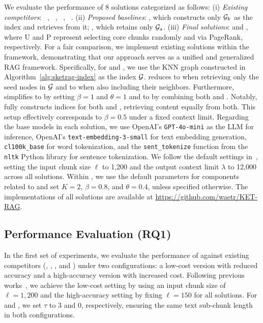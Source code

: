 We evaluate the performance of 8 solutions categorized as follows: (i) \textit{Existing competitors}: \textrag~\cite{lewis2020retrieval}, \knnrag~\cite{wang2024knowledge}, \kgrag~\cite{edge2024local}, \hybridrag~\cite{sarmah2024hybridrag}. (ii) \textit{Proposed baselines}: \keyrag, which constructs only $\mathcal{G}_k$ as the index and retrieves from it; \skeletonrag, which retains only $\mathcal{G}_s$. (iii) \textit{Final solutions}: \sketragu and \sketragp, where \textsf{U} and \textsf{P} represent selecting core chunks randomly and via PageRank, respectively. For a fair comparison, we implement existing solutions within the \sketrag framework, demonstrating that our approach serves as a unified and generalized RAG framework. Specifically, for \textrag and \knnrag, we use the KNN graph constructed in Algorithm~\ref{alg:sketrag-index} as the index $\mathcal{G}$. \sketrag reduces to \textrag when retrieving only the seed nodes in $\mathcal{G}$ and to \knnrag when also including their neighbors. Furthermore, \sketrag simplifies to \kgrag by setting $\beta=1$ and $\theta=1$ and to \hybridrag by combining both \textrag and \kgrag. Notably, \hybridrag fully constructs indices for both \textrag and \kgrag, retrieving content equally from both. This setup effectively corresponds to $\beta=0.5$ under a fixed context limit. 
Regarding the base models in each solution, we use OpenAI's \texttt{GPT-4o-mini} as the LLM for inference, OpenAI's \texttt{text-embedding-3-small} for text embedding generation, \texttt{cl100k\_base} for word tokenization, and the \texttt{sent\_tokenize} function from the \texttt{nltk} Python library for sentence tokenization.
We follow the default settings in~\citet{edge2024local}, setting the input chunk size $\ell$ to 1,200 and the output context limit $\lambda$ to 12,000 across all solutions. Within \sketrag, we use the default parameters for components related to \kgrag and set $K=2$, $\beta=0.8$, and $\theta=0.4$, unless specified otherwise.
The implementations of all solutions are available at {\color{blue}\url{https://github.com/waetr/KET-RAG}}.

\subsection{Performance Evaluation (RQ1)}
In the first set of experiments, we evaluate the performance of \sketrag against existing competitors (\textrag, \knnrag, \kgrag, and \hybridrag) under two configurations: a low-cost version with reduced accuracy and a high-accuracy version with increased cost. Following previous works~\cite{edge2024local}, we achieve the low-cost setting by using an input chunk size of $\ell = 1,200$ and the high-accuracy setting by fixing $\ell = 150$ for all solutions. For \keyrag and \sketrag, we set $\tau$ to 3 and 0, respectively, ensuring the same text sub-chunk length in both configurations.

